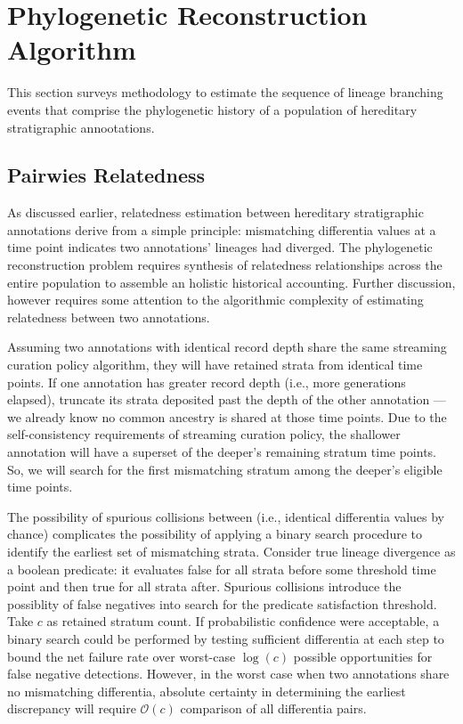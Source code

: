 \section{Phylogenetic Reconstruction Algorithm} \label{sec:reconstruction}

This section surveys methodology to estimate the sequence of lineage branching events that comprise the phylogenetic history of a population of hereditary stratigraphic annootations.

\subsection{Pairwies Relatedness} \label{sec:pairwise-relatedness}

As discussed earlier, relatedness estimation between hereditary stratigraphic annotations derive from a simple principle: mismatching differentia values at a time point indicates two annotations' lineages had diverged.
The phylogenetic reconstruction problem requires synthesis of relatedness relationships across the entire population to assemble an holistic historical accounting.
Further discussion, however requires some attention to the algorithmic complexity of estimating relatedness between two annotations.

Assuming two annotations with identical record depth share the same streaming curation policy algorithm, they will have retained strata from identical time points.
If one annotation has greater record depth (i.e., more generations elapsed), truncate its strata deposited past the depth of the other annotation --- we already know no common ancestry is shared at those time points.
Due to the self-consistency requirements of streaming curation policy, the shallower annotation will have a superset of the deeper's remaining stratum time points.
So, we will search for the first mismatching stratum among the deeper's eligible time points.

The possibility of spurious collisions between (i.e., identical differentia values by chance) complicates the possibility of applying a binary search procedure to identify the earliest set of mismatching strata.
Consider true lineage divergence as a boolean predicate: it evaluates false for all strata before some threshold time point and then true for all strata after.
Spurious collisions introduce the possiblity of false negatives into search for the predicate satisfaction threshold.
Take $c$ as retained stratum count.
If probabilistic confidence were acceptable, a binary search could be performed by testing sufficient differentia at each step to bound the net failure rate over worst-case $\log (c)$ possible opportunities for false negative detections.
However, in the worst case when two annotations share no mismatching differentia, absolute certainty in determining the earliest discrepancy will require $\mathcal{O}(c)$ comparison of all differentia pairs.

